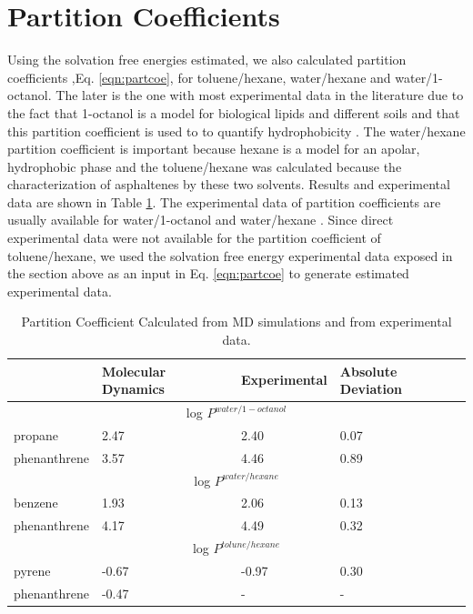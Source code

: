 \section{Partition Coefficients}

Using the solvation free energies estimated, we also calculated partition coefficients ,Eq. \eqref{eqn:partcoe}, for toluene/hexane, water/hexane and water/1-octanol. The later is the one with most experimental data in the literature due to the fact that 1-octanol is a model for biological lipids and different soils and that this partition coefficient is used to to quantify hydrophobicity \cite{RUELLE2000457}. The water/hexane partition coefficient is important because hexane is a model for an apolar, hydrophobic phase and the toluene/hexane was calculated because the characterization of asphaltenes by these two solvents. Results and experimental data are shown in Table \ref{tbl:part}. The experimental data of partition coefficients   are usually available for water/1-octanol  \cite{POOLE2000117,sangster} and water/hexane \cite{doi:10.1021/je970112e}. Since direct experimental data were not available for the partition coefficient of toluene/hexane, we used the solvation free energy experimental data exposed in the section above as an input in Eq. \eqref{eqn:partcoe} to generate estimated experimental data.


\begin{table}[H]
	\centering
	\caption{Partition Coefficient Calculated from MD simulations and from experimental data.}
	\label{tbl:part}
	\begin{tabular}{llll}
	    \hline
         & {Molecular Dynamics} & {Experimental}& Absolute Deviation\\
       \hline
       \multicolumn{4}{c}{log $P^{water/1-octanol}$} \\
           \hline
       propane &2.47  &  2.40 & 0.07\\
       phenanthrene &3.57  & 4.46 & 0.89\\
       \hline
       \multicolumn{4}{c}{log $P^{water/hexane}$} \\
           \hline
       benzene &1.93  &  2.06 & 0.13\\
       phenanthrene &4.17  & 4.49 & 0.32 \\
       \hline
       \multicolumn{4}{c}{log $P^{tolune/hexane}$} \\
           \hline 
       pyrene &-0.67  &  -0.97 & 0.30\\
       phenanthrene &-0.47  & - & - \\ 
           \hline     
	\end{tabular}
	
\end{table}


